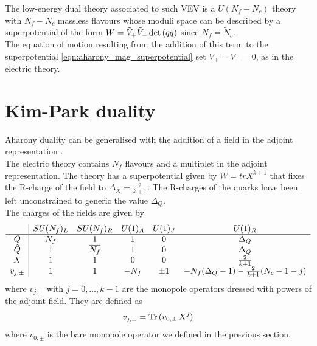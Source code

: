 The low-energy dual theory associated to such VEV is a $U(N_f - N_c)$ theory with $N_f - N_c$ massless flavours whose moduli space can be described by a superpotential of the form $W = \tilde{V}_+ \tilde{V}_- \, \mathrm{det } \,{( q \tilde{q})} $ since $N_f = \tilde{N}_c$.
\\
The equation of motion resulting from the addition of this term to the superpotential \eqref{eqn:aharony_mag_superpotential} set $V_+ = V_-= 0$, as in the electric theory.\\


\section{Kim-Park duality}
Aharony duality can be generalised with the addition of a field in the adjoint representation \cite{Kim:2013cma}.\\
The electric theory contains $N_f$ flavours and a multiplet in the adjoint representation. 
The theory has a superpotential given by $W = tr X^{k+1}$ that fixes the R-charge of the field to $\Delta_X = \frac{2}{k+1}$.
The R-charges of the quarks have been left unconstrained to generic the value $\Delta_Q$.\\
The charges of the fields are given by
\begin{equation}
\begin{array}{ c | c c c c c }
  & SU(N_f)_L & SU(N_f)_R & U(1)_A & U(1)_J  & U(1)_R   \\
 \hline
 Q & N_f & 1& 1 & 0   & \Delta_Q  \\  
 \tilde{Q} & 1 & \overline{N_f} & 1 & 0 & \Delta_Q      \\  
  X & 1 & 1  & 0 & 0 & \frac{2}{k+1}  \\ 
 v_{j,\pm} & 1  &1   & - N_f & \pm 1 & -N_f (\Delta_Q-1 ) - \frac{2}{k+1} (N_c-1 - j) \\
\end{array}
\end{equation}
where $v_{j,\pm}$ with $j=0,\dotsc,k-1$ are the monopole operators dressed with powers of the adjoint field. 
They are defined as 
\begin{equation}
v_{j,\pm} = \mathrm{Tr } \,{( v_{0,\pm} \, X^{j})}
\end{equation}
where $v_{0,\pm}$ is the bare monopole operator we defined in the previous section.\\
